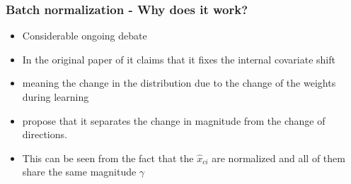 \documentclass{beamer}
\begin{document}
\begin{frame}
    \frametitle{Batch normalization - Why does it work?}
\begin{itemize}
    \item Considerable ongoing debate
\item In the original paper of \href{https://arxiv.org/abs/1502.03167}{} it claims that it fixes the internal covariate shift 
\item meaning the change in the distribution due to the change of the weights during learning 
\item \href{https://arxiv.org/abs/1805.10694v1}{} propose that it separates the change in magnitude from the change of directions.
\item This can be seen from the fact that the $\hat{x}_{ci}$ are normalized and all of them share the same magnitude $\gamma$

\end{itemize}
\end{frame}
\end{document}
